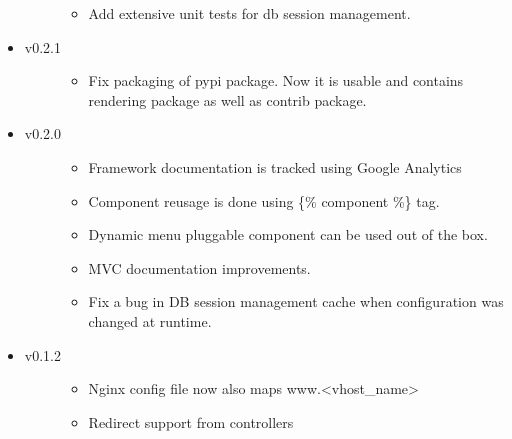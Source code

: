 \documentclass[letterpaper,10pt,english]{sphinxmanual}
\begin{document}
\begin{itemize}
\begin{description}
\begin{itemize}
\item {} 
Add extensive unit tests for db session management.

\end{itemize}

\end{description}

\item {} \begin{description}
\item[{v0.2.1}] \leavevmode\begin{itemize}
\item {} 
Fix packaging of pypi package. Now it is usable and contains rendering package as well as contrib package.

\end{itemize}

\end{description}

\item {} \begin{description}
\item[{v0.2.0}] \leavevmode\begin{itemize}
\item {} 
Framework documentation is tracked using Google Analytics

\item {} 
Component reusage is done using \{\% component \%\} tag.

\item {} 
Dynamic menu pluggable component can be used out of the box.

\item {} 
MVC documentation improvements.

\item {} 
Fix a bug in DB session management cache when configuration was changed at runtime.

\end{itemize}

\end{description}

\item {} \begin{description}
\item[{v0.1.2}] \leavevmode\begin{itemize}
\item {} 
Nginx config file now also maps www.\textless{}vhost\_name\textgreater{}

\item {} 
Redirect support from controllers


\end{itemize}
\end{description}
\end{itemize}
\end{document}
